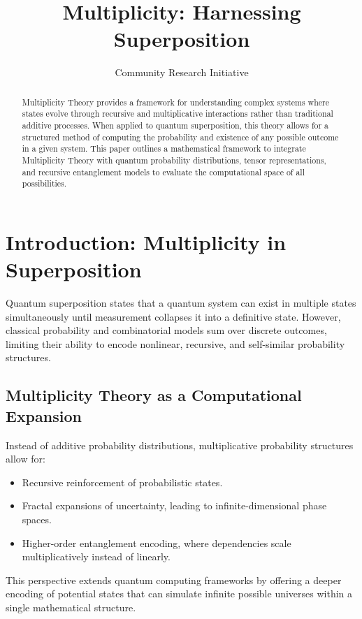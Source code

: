 \documentclass{article}
\title{Multiplicity: Harnessing Superposition}
\author{Community Research Initiative}
\affil{Citizen Gardens - The Foundation of Multiplicity \\ \texttt{info@citizengardens.org}}
\theoremstyle{plain}
\begin{document}
\maketitle

\begin{abstract}
Multiplicity Theory provides a framework for understanding complex systems where states evolve through recursive and multiplicative interactions rather than traditional additive processes. 
When applied to quantum superposition, this theory allows for a structured method of computing the probability and existence of any possible outcome in a given system. 
This paper outlines a mathematical framework to integrate Multiplicity Theory with quantum probability distributions, tensor representations, and recursive entanglement models to evaluate the computational space of all possibilities.
\end{abstract}

\section{Introduction: Multiplicity in Superposition}

Quantum superposition states that a quantum system can exist in multiple states simultaneously until measurement collapses it into a definitive state. 
However, classical probability and combinatorial models sum over discrete outcomes, limiting their ability to encode nonlinear, recursive, and self-similar probability structures.

\subsection{Multiplicity Theory as a Computational Expansion}

Instead of additive probability distributions, multiplicative probability structures allow for:

\begin{itemize}
    \item Recursive reinforcement of probabilistic states.
    \item Fractal expansions of uncertainty, leading to infinite-dimensional phase spaces.
    \item Higher-order entanglement encoding, where dependencies scale multiplicatively instead of linearly.
\end{itemize}

This perspective extends quantum computing frameworks by offering a deeper encoding of potential states that can simulate infinite possible universes within a single mathematical structure.
\end{document}

